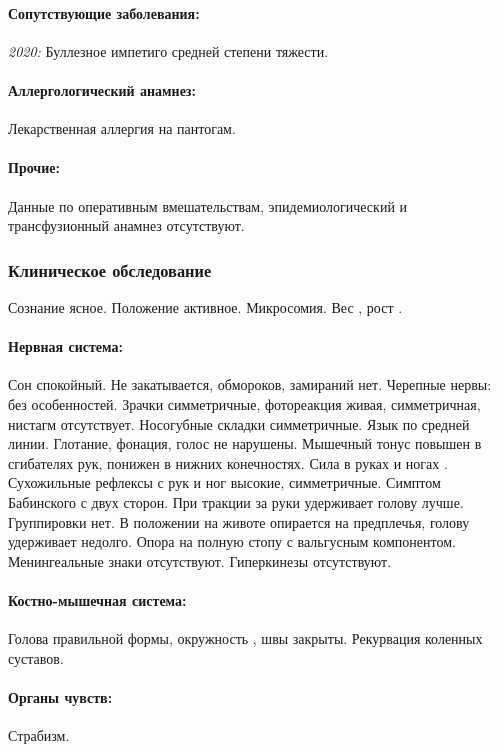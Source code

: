 \documentclass[a4paper,14pt]{extarticle}
\newcommand{\kilogramm}{кг}
\newcommand{\cm}{см}
\newcommand{\pdate}[1]{\emph{#1:} }
\begin{document}
\paragraph{Сопутствующие заболевания:} \pdate{2020} Буллезное импетиго средней степени тяжести.

\paragraph{Аллергологический анамнез:} Лекарственная аллергия на пантогам.

\paragraph{Прочие:} Данные по оперативным вмешательствам, эпидемиологический и трансфузионный анамнез отсутствуют.

\subsubsection*{Клиническое обследование}

Сознание ясное. Положение активное. Микросомия. Вес \numprint[\kilogramm]{6}, рост \numprint[\cm]{68}.

\paragraph{Нервная система:} Сон спокойный. Не закатывается, обмороков, замираний нет. Черепные нервы: без особенностей. Зрачки симметричные, фотореакция живая, симметричная, нистагм отсутствует. Носогубные складки симметричные. Язык по средней линии. Глотание, фонация, голос не нарушены. Мышечный тонус повышен в сгибателях рук, понижен в нижних конечностях. Сила в руках и ногах . Сухожильные рефлексы с рук и ног высокие, симметричные. Симптом Бабинского с двух сторон. При тракции за руки удерживает голову лучше. Группировки нет. В положении на животе опирается на предплечья, голову удерживает недолго. Опора на полную стопу с вальгусным компонентом. Менингеальные знаки отсутствуют. Гиперкинезы отсутствуют.

\paragraph{Костно-мышечная система:} Голова правильной формы, окружность \numprint[\cm]{41}, швы закрыты. Рекурвация коленных суставов.

\paragraph{Органы чувств:} Страбизм.
\end{document}
